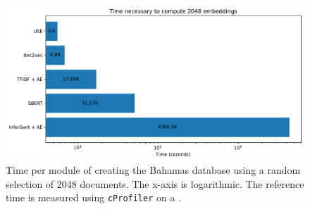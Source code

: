 \begin{figure}[!htb] %
    \centering
    \includegraphics[width=1\textwidth]{images/Elasticsearch/Time_necessary_to_compute_2048_embeddings_log.pdf}
    \caption[Times for creating the database]{Time per module of creating the Bahamas database using a random selection of 2048 documents.
    The x-axis is logarithmic.
    The reference time is measured using \texttt{cProfiler} on a \localMaschineStats{}.
    }
    \label{fig:time_init_db}
\end{figure}